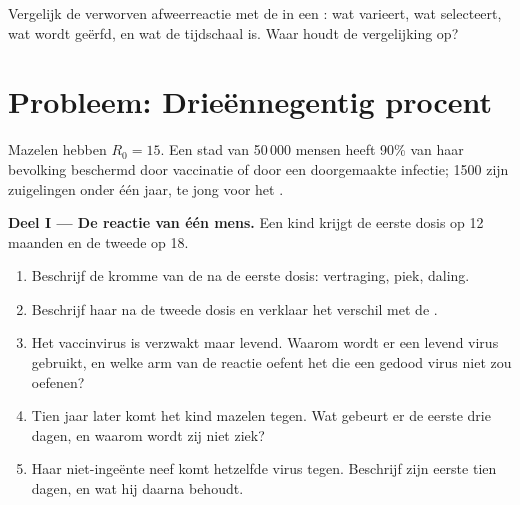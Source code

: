 \begin{exercise}[$\star\star\star$]\label{exo:g12:adaptive-immunity:15}
Vergelijk de verworven afweerreactie met de  in een
: wat varieert, wat selecteert, wat wordt geërfd, en wat de
tijdschaal is. Waar houdt de vergelijking op?
\end{exercise}

\section{Probleem: Drieënnegentig procent}

\begin{problem}
\label{pb:g12:adaptive-immunity:1}
Mazelen hebben $R_0 = 15$. Een stad van 50\,000 mensen heeft 90\% van haar
bevolking beschermd door vaccinatie of door een doorgemaakte infectie;
1500 zijn zuigelingen onder één jaar, te jong voor het .

\medskip
\noindent\textbf{Deel I --- De reactie van één mens.}
Een kind krijgt de eerste dosis op 12 maanden en de tweede op 18.
\begin{enumerate}
  \item Beschrijf de kromme van de  na de eerste dosis:
        vertraging, piek, daling.
  \item Beschrijf haar na de tweede dosis en verklaar het verschil met de
        .
  \item Het vaccinvirus is verzwakt maar levend. Waarom wordt er een
        levend virus gebruikt, en welke arm van de reactie oefent het die
        een gedood virus niet zou oefenen?
  \item Tien jaar later komt het kind mazelen tegen. Wat gebeurt er de
        eerste drie dagen, en waarom wordt zij niet ziek?
  \item Haar niet-ingeënte neef komt hetzelfde virus tegen. Beschrijf zijn
        eerste tien dagen, en wat hij daarna behoudt.
\end{enumerate}


\end{problem}
